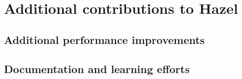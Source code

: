 \chapter{Additional contributions to Hazel}
\label{app:contributions}

\section{Additional performance improvements}
\label{sec:other_perf}


\section{Documentation and learning efforts}
\label{sec:study_group}


